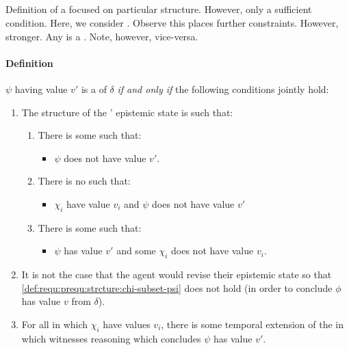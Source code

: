 \subsection{}
\label{sec:prequ3}

\begin{note}
  Definition of a \requ{} focused on particular structure.
  However, only a sufficient condition.
  Here, we consider \prequ{}.
  Observe this places further constraints.
  However, stronger.
  Any \prequ{} is a \crequ{}.
  Note, however, vice-versa.
\end{note}

\paragraph{Definition}

\begin{definition}
  \label{def:requ:prequ}
  \(\psi\) having value \(v'\) is a \emph{\prequ{}} of \(\delta\) \emph{if and only if} the following conditions jointly hold:
  \begin{enumerate}[label=\arabic*., ref=\named{P\(\Re\):\arabic*}]
  \item
    \label{def:requ:prequ:strcture}
    The structure of the \vAgent{}' epistemic state is such that:
    \begin{enumerate}[label=\alph*., ref=\named{P\(\Re\):1\alph*}]
    \item
      \label{def:requ:prequ:strcture:psi-not-v}
      There is some \epVW{} such that:
      \begin{itemize}
      \item
        \(\psi\) does not have value \(v'\).
      \end{itemize}
    \item
      \label{def:requ:prequ:strcture:chi-subset-psi}
      There is no \epVW{} such that:
      \begin{itemize}
      \item
        \(\chi_{i}\) have value \(v_{i}\) and \(\psi\) does not have value \(v'\)
      \end{itemize}
    \item
      \label{def:requ:prequ:strcture:chi-propersubset-psi}
      There is some \epVW{} such that:
      \begin{itemize}
      \item
        \(\psi\) has value \(v'\) and some \(\chi_{i}\) does not have value \(v_{i}\).
      \end{itemize}
    \end{enumerate}
  \item
    \label{def:requ:prequ:no-revision}
    It is not the case that the agent would revise their epistemic state so that \ref{def:requ:prequ:strcture:chi-subset-psi} does not hold (in order to conclude \(\phi\) has value \(v\) from \(\delta\)).
  \item
    \label{def:requ:prequ:possible-reason}
    For all \epVW{} in which \(\chi_{i}\) have values \(v_{i}\), there is some temporal extension of the \world{} in which \vAgent{} witnesses reasoning which concludes \(\psi\) has value \(v'\).
  \end{enumerate}
\end{definition}

